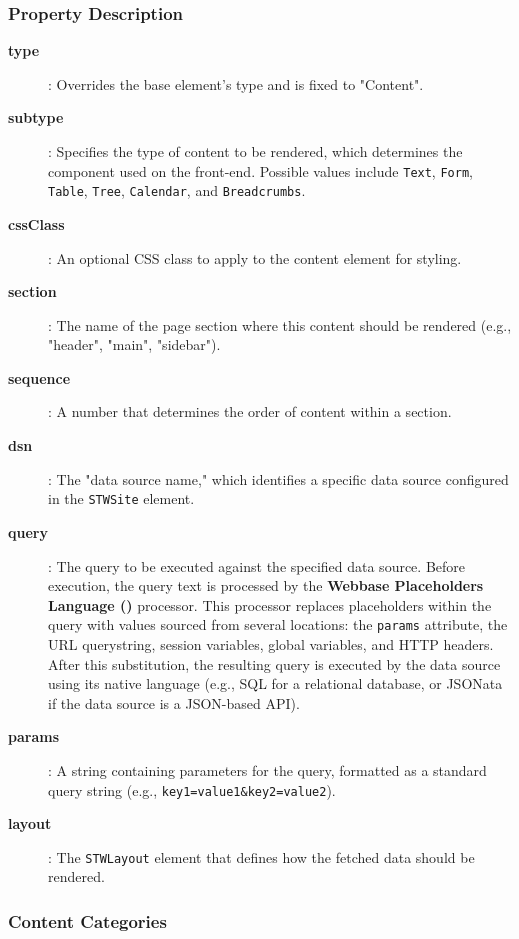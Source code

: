 \subsubsection{Property Description}

\begin{description}
\item[\textbf{type}]: Overrides the base element's type and is fixed to "Content".
\item[\textbf{subtype}]: Specifies the type of content to be rendered, which determines the component used on the front-end. Possible values include \texttt{Text}, \texttt{Form}, \texttt{Table}, \texttt{Tree}, \texttt{Calendar}, and \texttt{Breadcrumbs}.
\item[\textbf{cssClass}]: An optional CSS class to apply to the content element for styling.
\item[\textbf{section}]: The name of the page section where this content should be rendered (e.g., "header", "main", "sidebar").
\item[\textbf{sequence}]: A number that determines the order of content within a section.
\item[\textbf{dsn}]: The "data source name," which identifies a specific data source configured in the \texttt{STWSite} element.
\item[\textbf{query}]: The query to be executed against the specified data source. Before execution, the query text is processed by the \textbf{Webbase Placeholders Language (\wbpl{})} processor. This processor replaces placeholders within the query with values sourced from several locations: the \texttt{params} attribute, the URL querystring, session variables, global variables, and HTTP headers. After this substitution, the resulting query is executed by the data source using its native language (e.g., SQL for a relational database, or JSONata if the data source is a JSON-based API).
\item[\textbf{params}]: A string containing parameters for the query, formatted as a standard query string (e.g., \texttt{key1=value1\&key2=value2}).
\item[\textbf{layout}]: The \texttt{STWLayout} element that defines how the fetched data should be rendered.
\end{description}

\subsubsection{Content Categories}
\label{sec:content-categories}

